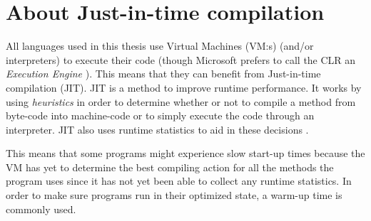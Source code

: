 \section{About Just-in-time compilation} \label{sec:jit}
All languages used in this thesis use Virtual Machines (VM:s) (and/or interpreters) to execute their code (though Microsoft prefers to call the CLR an \textit{Execution Engine} \cite{ExecutionEngine}). This means that they can benefit from Just-in-time compilation (JIT). JIT is a method to improve runtime performance. It works by using \textit{heuristics} in order to determine whether or not to compile a method from byte-code into machine-code or to simply execute the code through an interpreter. JIT also uses runtime statistics to aid in these decisions \cite{Jit}.

This means that some programs might experience slow start-up times because the VM has yet to determine the best compiling action for all the methods the program uses since it has not yet been able to collect any runtime statistics. In order to make sure programs run in their optimized state, a warm-up time is commonly used.
